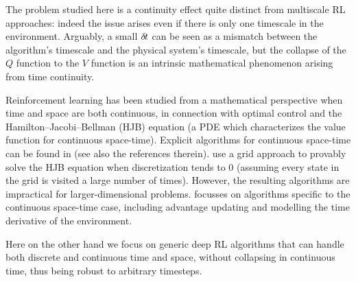 
The problem studied here is a continuity effect quite distinct from
multiscale RL approaches: indeed the issue arises even if there
is only one timescale in the environment. Arguably, a small
${\delta\hspace{-.1em}t}$ can be seen as a mismatch between the algorithm's
timescale and the physical system's timescale, but the collapse of the
$Q$ function to the $V$ function is an intrinsic mathematical phenomenon arising from time
continuity.

Reinforcement learning has been studied from a mathematical perspective
when time and space are both continuous, in connection with optimal
control and the Hamilton--Jacobi--Bellman (HJB) equation (a PDE which
characterizes the value function for continuous space-time). Explicit
algorithms for continuous
space-time can be found in
\cite{cont_rl,MunosBourgines98} (see also the references therein).
\cite{MunosBourgines98} use a grid approach to provably solve the HJB
equation when discretization tends to $0$ (assuming every state in the
grid is visited a large number of times). However,
the resulting algorithms are
impractical \cite{cont_rl} for larger-dimensional problems.
\cite{cont_rl} focusses on algorithms specific to the continuous
space-time case, including advantage updating and modelling
the time derivative of the environment.

Here on the other hand we focus on generic deep RL algorithms that can handle
both discrete and continuous time and space, without collapsing in
continuous time, thus being robust to arbitrary timesteps.



